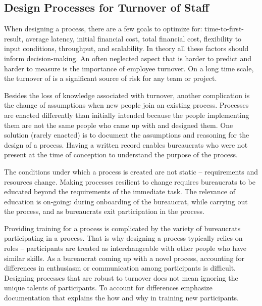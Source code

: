 \subsection*{Design Processes for Turnover of Staff\label{sec:turnover}}


When designing a \gls{process}, there are a few goals to optimize for: time-to-first-result, average latency, initial financial cost, total financial cost, flexibility to input conditions, throughput, and scalability. In theory all these factors should inform decision-making. An often neglected aspect that is harder to predict and harder to measure is the importance of employee turnover. 
On a long time scale, the turnover of \iftoggle{glossarysubstitutionworks}{\glspl{bureaucrat}}{bureaucrats} is 
a significant source of risk for any team or project. 

Besides the loss of knowledge associated with turnover, another complication is the change of assumptions when new people join an existing process. 
Processes are enacted differently than initially intended because the people implementing them are not the same people who came up with and designed them. One solution (rarely enacted) is to document the assumptions and reasoning for the design of a process. Having a written record enables bureaucrats who were not present at the time of conception to understand the purpose of the process. 

The conditions under which a process is created are not static -- requirements and resources change. 
Making processes resilient to change requires  bureaucrats to be educated beyond the requirements of the immediate task. The relevance of education is on-going: during onboarding of the bureaucrat, while carrying out the process, and as bureaucrats exit participation in the process. 

Providing training for a process is complicated by the variety of bureaucrats participating in a process.
That is why designing a process typically relies on roles -- participants are treated as interchangeable with other people who have similar skills. As a bureaucrat coming up with a novel process, accounting for differences in enthusiasm or communication among participants is difficult. 
Designing processes that are robust to turnover does not mean ignoring the unique talents of participants. 
To account for differences emphasize documentation that explains the how and why in training new participants. 
%


